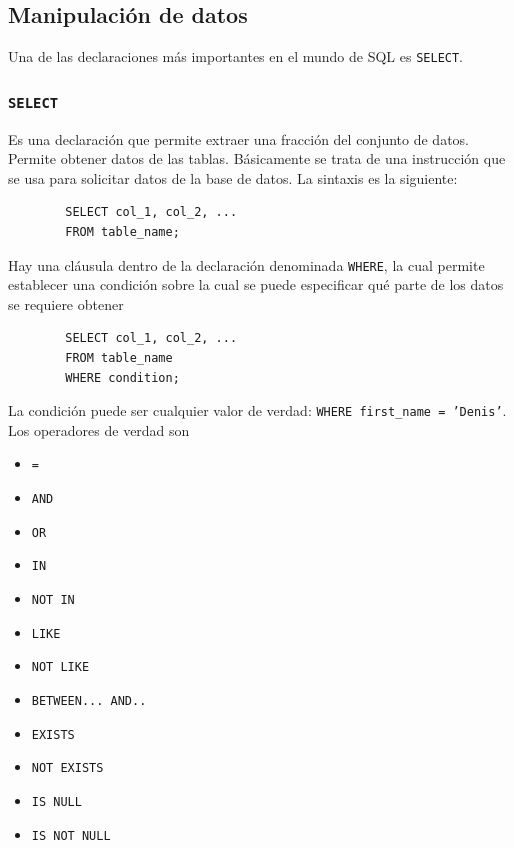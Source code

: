     \subsection{Manipulación de datos}

        Una de las declaraciones más importantes en el mundo de SQL es \texttt{SELECT}. 
        \subsubsection{ \texttt{SELECT}}
        Es una declaración que permite extraer una fracción del conjunto de datos. Permite obtener datos de las tablas. Básicamente se trata de una instrucción que se usa para solicitar datos de la base de datos. La sintaxis es la siguiente:
        \begin{verbatim}
        SELECT col_1, col_2, ...
        FROM table_name;
        \end{verbatim}
        Hay una cláusula dentro de la declaración denominada \texttt{WHERE}, la cual permite establecer una condición sobre la cual se puede especificar qué parte de los datos se requiere obtener
        \begin{verbatim}
        SELECT col_1, col_2, ...
        FROM table_name
        WHERE condition;
        \end{verbatim}
        La condición puede ser cualquier valor de verdad: \texttt{WHERE first\_name = 'Denis'}. Los operadores de verdad son 

        \begin{itemize}
            \item \texttt{=}
            \item \texttt{AND}
            \item \texttt{OR}
            \item \texttt{IN}
            \item \texttt{NOT IN}
            \item \texttt{LIKE}
            \item \texttt{NOT LIKE}
            \item \texttt{BETWEEN... AND..}
            \item \texttt{EXISTS}
            \item \texttt{NOT EXISTS}
            \item \texttt{IS NULL}
            \item \texttt{IS NOT NULL}

        \end{itemize}

